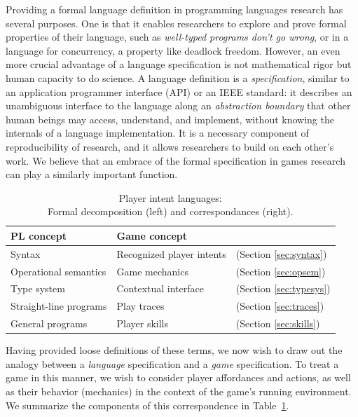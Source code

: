   Providing a formal language definition in programming languages research
  has several purposes. One is that it enables researchers to explore
  and prove formal properties of their language, such as {\em well-typed
  programs don't go wrong}, or in a language for concurrency, a property
  like deadlock freedom. However, an even more crucial advantage of a
  language specification is not mathematical rigor but human capacity to do
  science. A language definition is a {\em specification}, similar to an
  application programmer interface (API) or an IEEE standard: it describes
  an unambiguous interface to the language along an {\em abstraction
  boundary} that other human beings may access, understand, and implement,
  without knowing the internals of a language implementation.  It is a
  necessary component of reproducibility of research, and it allows
  researchers to build on each other's work. We believe that an embrace of
  the formal specification in games research can play a similarly important
  function.

  \begin{table}
  \begin{tabular}{l|ll}
    PL concept & Game concept\\
    \hline
    Syntax & Recognized player intents & (Section \ref{sec:syntax})\\
    Operational semantics & Game mechanics & (Section \ref{sec:opsem})\\
    Type system & Contextual interface & (Section \ref{sec:typesys})\\
    Straight-line programs & Play traces & (Section \ref{sec:traces})\\ 
    General programs & Player skills & (Section \ref{sec:skills})
    \\
    \hline
  \end{tabular}
  \caption{Player intent languages: 
    \\
    Formal decomposition (left) and correspondances (right).}
  \label{tab:correspondence}
  \end{table}

  Having provided loose definitions of these terms, we now wish to draw out
  the analogy between a {\em language} specification and a {\em game}
  specification. To treat a game in this manner, we wish to consider player
  affordances and actions, as well as their behavior (mechanics) in the
  context of the game's running environment. We summarize the components of
  this correspondence in Table~\ref{tab:correspondence}.

